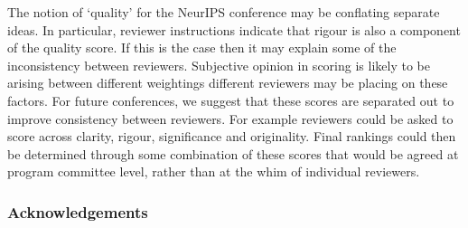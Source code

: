 \documentclass[twoside]{article}
\begin{document}
The notion of `quality' for the NeurIPS conference may be conflating separate ideas. In particular, reviewer instructions indicate that rigour is also a component of the quality score. If this is the case then it may explain some of the inconsistency between reviewers. Subjective opinion in scoring is likely to be arising between different weightings different reviewers may be placing on these factors. For future conferences, we suggest that these scores are separated out to improve consistency between reviewers. For example reviewers could be asked to score across clarity, rigour, significance and originality. Final rankings could then be determined through some combination of these scores that would be agreed at program committee level, rather than at the whim of individual reviewers. 

\subsubsection*{Acknowledgements}




\appendix

\onecolumn
{}


\vfill
\end{document}
